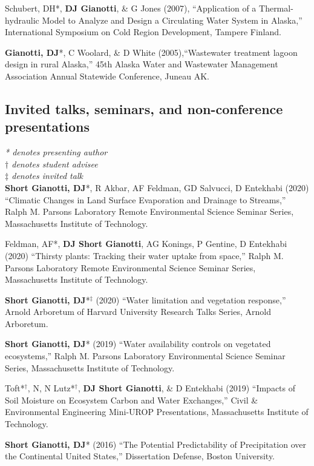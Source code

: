 \documentclass[10pt, a4paper]{article}
\renewcommand{\emph}[1]{\textit{#1}}
\newcommand{\lbr}{\vspace*{12pt}}
\newcommand{\years}[1]{\mbox{}\marginnote{\scriptsize #1}} %
\begin{document}
\years{2007}Schubert, DH*, \textbf{DJ Gianotti}, \& G Jones (2007), ``Application of a Thermal-hydraulic Model to Analyze and Design a Circulating Water System in Alaska,'' International Symposium on Cold Region Development, Tampere Finland.\lbr

\years{2005}\textbf{Gianotti, DJ}*, C Woolard, \& D White (2005),``Wastewater treatment lagoon design in rural Alaska,'' 45th Alaska Water and Wastewater Management Association Annual Statewide Conference, Juneau AK.\lbr


\subsection*{Invited talks, seminars, and non-conference presentations}
\emph{* denotes presenting author}
\\ \emph{$\dagger$ denotes student advisee}
\\ \emph{$\ddag$ denotes invited talk}\\

\years{2020}\textbf{Short Gianotti, DJ}*, R Akbar, AF Feldman, GD Salvucci, D Entekhabi (2020) ``Climatic Changes in Land Surface Evaporation and Drainage to Streams,'' Ralph M. Parsons Laboratory Remote Environmental Science Seminar Series, Massachusetts Institute of Technology.\lbr %

\years{2020}Feldman, AF*, \textbf{DJ Short Gianotti}, AG Konings, P Gentine, D Entekhabi (2020) ``Thirsty plants: Tracking their water uptake from space,'' Ralph M. Parsons Laboratory Remote Environmental Science Seminar Series, Massachusetts Institute of Technology.\lbr %
			
\years{2020}\textbf{Short Gianotti, DJ}*$^\ddag$ (2020) ``Water limitation and vegetation response,'' Arnold Arboretum of Harvard University Research Talks Series, Arnold Arboretum.\lbr %

\years{2019}\textbf{Short Gianotti, DJ}* (2019) ``Water availability controls on vegetated ecosystems,'' Ralph M. Parsons Laboratory Environmental Science Seminar Series, Massachusetts Institute of Technology.\lbr %

\years{2019}Toft*$^\dagger$, N, N Lutz*$^\dagger$, \textbf{DJ Short Gianotti}, \& D Entekhabi (2019) ``Impacts of Soil Moisture on Ecosystem Carbon and Water Exchanges,'' Civil \& Environmental Engineering Mini-UROP Presentations, Massachusetts Institute of Technology.\lbr %

\years{2016}\textbf{Short Gianotti, DJ}* (2016) ``The Potential Predictability of Precipitation over the Continental United States,'' Dissertation Defense, Boston University.\lbr %
\end{document}
